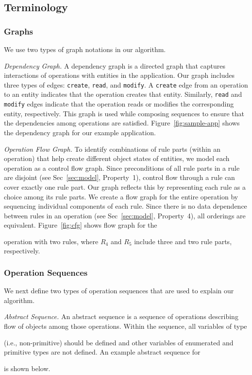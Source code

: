 \subsection{Terminology}

\subsubsection{Graphs}
We use two types of graph notations in our algorithm.

\textit{Dependency Graph.} A dependency graph is a directed graph that
captures interactions of operations with entities in the application.
Our graph includes three types of edges: {\tt create}, {\tt read}, and {\tt modify}.
A {\tt create} edge from an operation to an entity indicates that the operation
creates that entity. Similarly, {\tt read} and {\tt modify} edges indicate that
the operation reads or modifies the corresponding entity, respectively.
This graph is used while composing sequences to ensure that the dependencies among operations are satisfied.
Figure~\ref{fig:sample-app} shows the dependency graph for our example application.

\textit{Operation Flow Graph.} To identify combinations of rule parts (within an operation)
that help create different object states of entities, we model each operation as a control
flow graph. Since preconditions of all rule parts in
a rule are disjoint (see Sec~\ref{sec:model}, Property~1), control flow through a rule can cover
exactly one rule part. Our graph reflects this by
representing each rule as a choice among its rule parts. We create a flow graph for the entire
operation by sequencing individual components of each rule. 
Since there is no data dependence between rules in an operation (see Sec~\ref{sec:model}, Property~4),
all orderings are equivalent. Figure~\ref{fig:cfg} shows flow graph for 
the \subject{GenerateInvoice} operation with two rules, where $R_4$
and $R_5$ include three and two rule parts, respectively.

\subsubsection{Operation Sequences}
We next define two types of operation sequences that are used to explain
our algorithm.

\textit{Abstract Sequence.} An abstract sequence is a sequence of operations describing
flow of objects among those operations. Within the sequence, all variables
of type \subject{Object} (i.e., non-primitive) should be defined and other variables of enumerated and primitive types are not
defined. An example abstract sequence for \subject{GenerateInvoice} is shown below.

